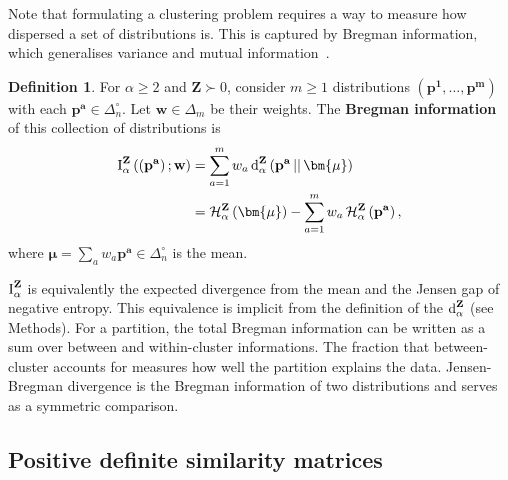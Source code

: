 \documentclass[aps,pre,floats,floatfix,superscriptaddress,twocolumn,final,10pt]{revtex4-2}
\theoremstyle{definition}
\newtheorem{definition}{Definition}
\renewcommand{\vec}[1]{\mathbf{#1}}
\newcommand{\divergence}[4]{\textnormal{d}^{#1}_{#2}\left(#3\, || \, #4\right)}
\newcommand{\divergencename}[2]{\textnormal{d}^{#1}_{#2}}
\newcommand{\entropy}[3]{\mathcal{H}^{#1}_{#2}\left(#3\right)}
\begin{document}
Note that formulating a clustering problem requires a way to measure how dispersed a set of distributions is. This is captured by Bregman information, which generalises variance and mutual information~\cite{Banerjee2004}.
\begin{definition}
    For $\alpha \geq 2$ and $\vec{Z}\succ0$, consider $m\geq1$ distributions $\left( \vec{p^1},\dots,\vec{p^m} \right)$ with each $\vec{p^a}\in\Delta_n^\circ$. Let $\vec{w}\in\Delta_m$ be their weights. The \textbf{Bregman information} of this collection of distributions is
    \begin{equation}
    \begin{split}
        \textnormal{I}^\vec{Z}_\alpha\left( \left(\vec{p^a}\right); \vec{w}\right) &= \sum_{a=1}^m w_a\,\divergence{\vec{Z}}{\alpha}{\vec{p^a}}{\bm{\mu}}\\
        &= \entropy{\vec{Z}}{\alpha}{\bm{\mu}} - \sum_{a=1}^mw_a\,\entropy{\vec{Z}}{\alpha}{\vec{p^a}},
    \end{split}
    \end{equation}
    where $\bm{\mu}=\sum_aw_a\vec{p^a}\in\Delta_n^\circ$ is the mean.
\label{def:bregman_information}
\end{definition}
$\textnormal{I}^\vec{Z}_\alpha$ is equivalently the expected divergence from the mean and the Jensen gap of negative entropy. This equivalence is implicit from the definition of the $\divergencename{\vec{Z}}{\alpha}$ (see Methods). For a partition, the total Bregman information can be written as a sum over between and within-cluster informations. The fraction that between-cluster accounts for measures how well the partition explains the data. Jensen-Bregman divergence is the Bregman information of two distributions and serves as a symmetric comparison.



\subsection{Positive definite similarity matrices}
\end{document}
